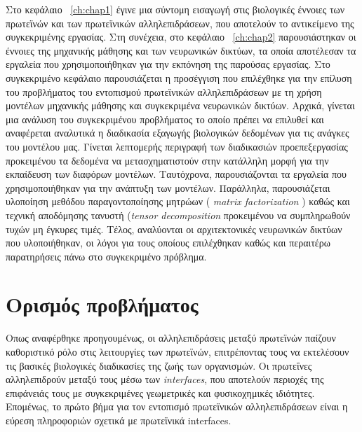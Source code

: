 

Στο κεφάλαιο ~\ref{ch:chap1} έγινε μια σύντομη εισαγωγή στις βιολογικές έννοιες των πρωτεϊνών και των πρωτεϊνικών αλληλεπιδράσεων, που αποτελούν το αντικείμενο της συγκεκριμένης εργασίας. Στη συνέχεια, στο κεφάλαιο ~\ref{ch:chap2} παρουσιάστηκαν οι έννοιες της μηχανικής μάθησης και των νευρωνικών δικτύων, τα οποία αποτέλεσαν τα εργαλεία που χρησιμοποιήθηκαν για την εκπόνηση της παρούσας εργασίας. Στο συγκεκριμένο κεφάλαιο παρουσιάζεται η προσέγγιση που επιλέχθηκε για την επίλυση του προβλήματος του εντοπισμού πρωτεϊνικών αλληλεπιδράσεων με τη χρήση μοντέλων μηχανικής μάθησης και συγκεκριμένα νευρωνικών δικτύων. Αρχικά, γίνεται μια ανάλυση του συγκεκριμένου προβλήματος το οποίο πρέπει να επιλυθεί και αναφέρεται αναλυτικά η διαδικασία εξαγωγής βιολογικών δεδομένων για τις ανάγκες του μοντέλου μας. Γίνεται λεπτομερής περιγραφή των διαδικασιών προεπεξεργασίας προκειμένου τα δεδομένα να μετασχηματιστούν στην κατάλληλη μορφή για την εκπαίδευση των διαφόρων μοντέλων. Ταυτόχρονα, παρουσιάζονται τα εργαλεία που χρησιμοποιήθηκαν για την ανάπτυξη των μοντέλων. Παράλληλα, παρουσιάζεται υλοποίηση μεθόδου παραγοντοποίησης μητρώων ( \textit{matrix factorization} ) καθώς και τεχνική αποδόμησης τανυστή (\textit{tensor decomposition} προκειμένου να συμπληρωθούν τυχών μη έγκυρες τιμές. Τέλος, αναλύονται οι αρχιτεκτονικές νευρωνικών δικτύων που υλοποιήθηκαν, οι λόγοι για τους οποίους επιλέχθηκαν καθώς και περαιτέρω παρατηρήσεις πάνω στο συγκεκριμένο πρόβλημα.

\newpage
\section{Ορισμός προβλήματος}

Οπως αναφέρθηκε προηγουμένως, οι αλληλεπιδράσεις μεταξύ πρωτεϊνών παίζουν καθοριστικό ρόλο στις λειτουργίες των πρωτεϊνών, επιτρέποντας τους να εκτελέσουν τις βασικές βιολογικές διαδικασίες της ζωής των οργανισμών. Οι πρωτεΐνες αλληλεπιδρούν μεταξύ τους μέσω των \textit{inter\-faces}, που αποτελούν περιοχές της επιφάνειάς τους με συγκεκριμένες γεωμετρικές και φυσικοχημικές ιδιότητες. Επομένως, το πρώτο βήμα για τον εντοπισμό πρωτεϊνικών αλληλεπιδράσεων είναι η εύρεση πληροφοριών σχετικά με πρωτεϊνικά interfaces.

